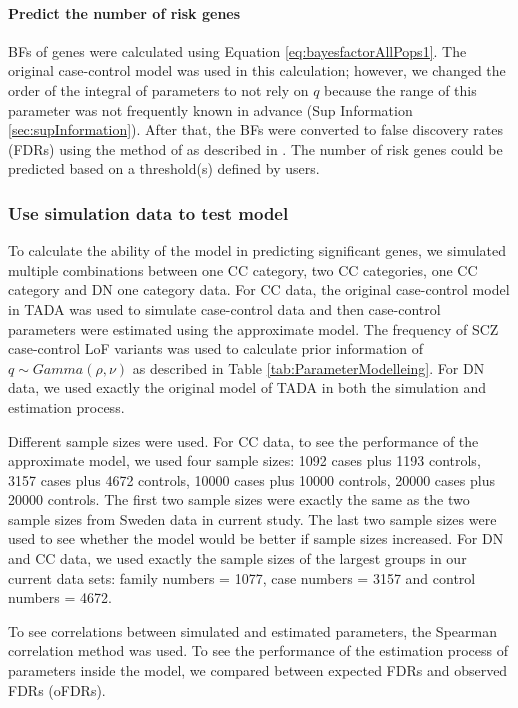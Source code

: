 \documentclass[]{article}
\begin{document}
\paragraph{Predict the number of risk genes}

BFs of genes were calculated using Equation
\ref{eq:bayesfactorAllPops1}. The original case-control model was used
in this calculation; however, we changed the order of the integral of
parameters to not rely on $q$ because the range of this parameter was
not frequently known in advance (Sup Information
\ref{sec:supInformation}). After that, the BFs were converted to false
discovery rates (FDRs) using the method of \cite{newton2004detecting} as described in \cite{de2014synaptic}. The
number of risk genes could be predicted based on a threshold(s)
defined by users.


\subsubsection{Use simulation data to test model}

To calculate the ability of the model in predicting significant genes,
we simulated multiple combinations between one CC category, two CC
categories, one CC category and DN one category data. For CC data,
the original case-control
model in TADA \citep{he2013integrated} was used to simulate
case-control data and then case-control parameters were estimated using
the approximate model. The frequency of SCZ case-control LoF variants was used to
calculate prior information of $q \sim Gamma(\rho, \nu)$ as described
in Table \ref{tab:ParameterModelleing}. For DN data, we used exactly the
original model of TADA in both the simulation and estimation
process.

Different sample sizes were used. For CC data, to see the
performance of the approximate model, we used four sample sizes: 1092
cases plus 1193 controls, 3157 cases plus 4672 controls, 10000 cases
plus 10000 controls, 20000 cases plus 20000 controls. The first two
sample sizes were exactly the same as the two sample sizes from Sweden
data in current study. The last two sample sizes were used to see
whether the model would be better if sample sizes increased. For DN
and CC data, we used exactly the sample sizes of the largest groups in
our current data sets: family numbers = 1077,
case numbers = 3157 and control numbers = 4672.


To see correlations between simulated and estimated parameters,
the Spearman correlation method \citep{spearman1904proof} was used.
To see the performance of the estimation process of parameters inside
the model, we compared between expected FDRs and observed FDRs (oFDRs).
\end{document}

